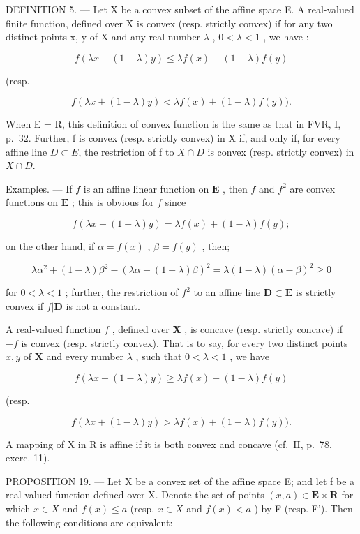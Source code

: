 DEFINITION 5. --- Let X be a convex subset of the affine space E. A real-valued finite function, defined over X is convex (resp. strictly convex) if for any two distinct points x, y of X and any real number \(\lambda\) , \(0 < \lambda < 1\) , we have :

\[
f (\lambda x + (1 - \lambda) y) \leqslant \lambda f (x) + (1 - \lambda) f (y)\tag{1}
\]

(resp.

\[
f (\lambda x + (1 - \lambda) y) <   \lambda f (x) + (1 - \lambda) f (y)).\tag{2}
\]

When E = R, this definition of convex function is the same as that in FVR, I, p.~32. Further, f is convex (resp. strictly convex) in X if, and only if, for every affine line \(D \subset E\), the restriction of f to \(X \cap D\) is convex (resp. strictly convex) in \(X \cap D\).

Examples. --- If \(f\) is an affine linear function on \(\mathbf{E}\) , then \(f\) and \(f^2\) are convex functions on \(\mathbf{E}\) ; this is obvious for \(f\) since

\[
f (\lambda x + (1 - \lambda) y) = \lambda f (x) + (1 - \lambda) f (y);
\]

on the other hand, if \(\alpha = f(x)\) , \(\beta = f(y)\) , then;

\[
\lambda \alpha^ {2} + (1 - \lambda) \beta^ {2} - (\lambda \alpha + (1 - \lambda) \beta) ^ {2} = \lambda (1 - \lambda) (\alpha - \beta) ^ {2} \geqslant 0
\]

for \(0 < \lambda < 1\) ; further, the restriction of \(f^2\) to an affine line \(\mathbf{D} \subset \mathbf{E}\) is strictly convex if \(f|\mathbf{D}\) is not a constant.

A real-valued function \(f\) , defined over \(\mathbf{X}\) , is concave (resp. strictly concave) if \(-f\) is convex (resp. strictly convex). That is to say, for every two distinct points \(x, y\) of \(\mathbf{X}\) and every number \(\lambda\) , such that \(0 < \lambda < 1\) , we have

\[
f (\lambda x + (1 - \lambda) y) \geqslant \lambda f (x) + (1 - \lambda) f (y)
\]

(resp.

\[
f (\lambda x + (1 - \lambda) y) > \lambda f (x) + (1 - \lambda) f (y)).
\]

A mapping of X in R is affine if it is both convex and concave (cf.~II, p.~78, exerc. 11).

PROPOSITION 19. --- Let X be a convex set of the affine space E; and let f be a real-valued function defined over X. Denote the set of points \((x, a) \in \mathbf{E} \times \mathbf{R}\) for which \(x \in X\) and \(f(x) \leqslant a\) (resp. \(x \in X\) and \(f(x) < a\) ) by F (resp. F'). Then the following conditions are equivalent:


